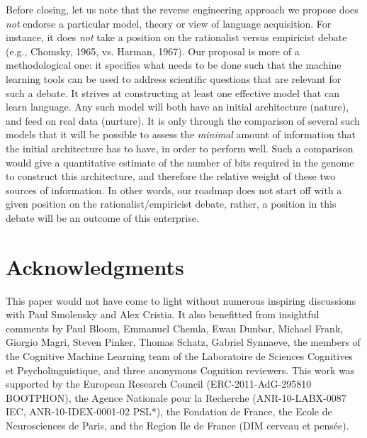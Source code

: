 \documentclass[jou,apacite]{apa6}
\begin{document}
Before closing, let us note that the reverse engineering approach we propose does \emph{not} endorse a particular model, theory or view of language acquisition. For instance, it does \emph{not} take a position on the rationalist versus empiricist debate (e.g., Chomsky, 1965, vs. Harman, 1967). Our proposal is more of a methodological one: it specifies what needs to be done such that the machine learning tools can be used to address scientific questions that are relevant for such a debate. It strives at constructing at least one effective model that can learn language. Any such model will both have an initial architecture (nature), and feed on real data (nurture). It is only through the comparison of several such models that it will be possible to assess the \emph{minimal} amount of information that the initial architecture has to have, in order to perform well. Such a comparison would give a quantitative estimate of the number of bits required in the genome to construct this architecture, and therefore the relative weight of these two sources of information. In other words, our roadmap does not start off with a given position on the rationalist/empiricist debate, rather, a position in this debate will be an outcome of this enterprise.


















\section*{Acknowledgments}
This paper would not have come to light without numerous inspiring discussions with Paul Smolensky and Alex Cristia.  It also benefitted from insightful comments by Paul Bloom, Emmanuel Chemla, Ewan Dunbar, Michael Frank, Giorgio Magri, Steven Pinker, Thomas Schatz, Gabriel Synnaeve, the members of the Cognitive Machine Learning team of the Laboratoire de Sciences Cognitives et Psycholinguistique, and three anonymous Cognition reviewers. This work was supported by the European Research Council (ERC-2011-AdG-295810 BOOTPHON), the Agence Nationale pour la Recherche (ANR-10-LABX-0087 IEC, ANR-10-IDEX-0001-02 PSL*), the Fondation de France, the Ecole de Neurosciences de Paris, and the Region Ile de France (DIM cerveau et pens\'ee).
\end{document}
